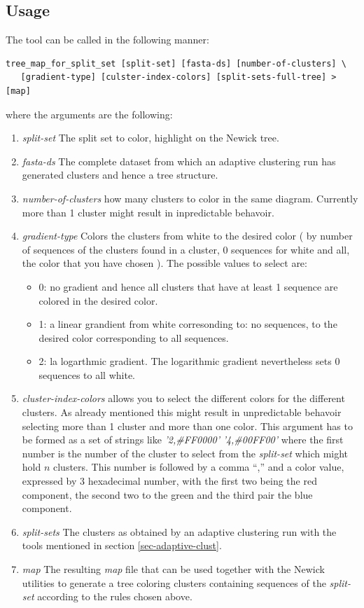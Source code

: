 \subsection{Usage}
The tool can be called in the following manner:
\begin{lstlisting}
tree_map_for_split_set [split-set] [fasta-ds] [number-of-clusters] \
   [gradient-type] [culster-index-colors] [split-sets-full-tree] > [map]
\end{lstlisting}
where the arguments are the following:
\begin{enumerate}
  \item \emph{split-set} The split set to color, highlight on the
    Newick tree.
  \item \emph{fasta-ds} The complete dataset from which an adaptive
    clustering run has generated clusters and hence a tree structure.
  \item \emph{number-of-clusters} how many clusters to color in the
    same diagram. Currently more than 1 cluster might result in
    inpredictable behavoir.
  \item \emph{gradient-type}
    Colors the clusters from white to the desired color ( by number of
    sequences of the clusters found in a cluster, 0 sequences for white and all,
    the color that you have chosen ). The possible values to select
    are:
    \begin{itemize}
      \item 0: no gradient and hence all clusters that have at least 1
        sequence are colored in the desired color.
      \item 1: a linear grandient from white corresonding to: no
        sequences,
        to the desired color corresponding to all sequences.
      \item 2: la logarthmic gradient. The logarithmic gradient
        nevertheless sets 0 sequences to all white.
    \end{itemize}
  \item \emph{cluster-index-colors} allows you to select the different
    colors for the different clusters. As already mentioned this might
    result in unpredictable behavoir selecting more than 1 cluster and
    more than one color. This argument has to be formed as a set of
    strings like \emph{'2,\#FF0000'} \emph{'4,\#00FF00'} where the
    first number is the number of the cluster to select from the
    \emph{split-set} which might hold $n$ clusters. This number is
    followed by a comma ``,'' and a color value, expressed by 3
    hexadecimal number, with the first two being the red component, the
    second two to the green and the third pair the blue component.
  \item \emph{split-sets} The clusters as obtained by an adaptive
    clustering run with the tools mentioned in section
    \ref{sec-adaptive-clust}.
  \item \emph{map} The resulting \emph{map} file that can be used
    together with the Newick utilities to generate a tree coloring
    clusters containing sequences of the \emph{split-set} according to
    the rules chosen above.
\end{enumerate}
